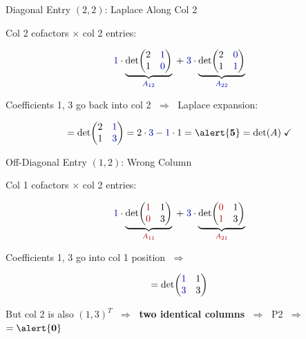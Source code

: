 \documentclass[10pt]{beamer}
\theoremstyle{definition}
\newcommand{\x}[1]{\alert{\textbf{#1}}}
\newcommand{\rd}[1]{{\color{red!70!black}#1}}
\newcommand{\bl}[1]{{\color{blue!70!black}#1}}
\begin{document}
\begin{frame}{Diagonal Entry $(2,2)$: Laplace Along \bl{Col 2}}

\bl{Col 2} cofactors $\times$ \bl{col 2} entries:

$$\bl{1}\cdot\underbrace{\det\!\begin{pmatrix}2&\bl{1}\\1&\bl{0}\end{pmatrix}}_{\bl{A_{12}}}
\;+\;
\bl{3}\cdot\underbrace{\det\!\begin{pmatrix}2&\bl{0}\\1&\bl{1}\end{pmatrix}}_{\bl{A_{22}}}$$

\vfill

Coefficients \bl{1}, \bl{3} go back into \bl{col 2} $\;\Longrightarrow\;$ Laplace expansion:

$$= \det\!\begin{pmatrix}2&\bl{1}\\1&\bl{3}\end{pmatrix}
= 2\cdot\bl{3} - \bl{1}\cdot 1 = \x{5} = \det(A) \;\checkmark$$

\end{frame}


\begin{frame}{Off-Diagonal Entry $(1,2)$: Wrong Column}

\rd{Col 1} cofactors $\times$ \bl{col 2} entries:

$$\bl{1}\cdot\underbrace{\det\!\begin{pmatrix}\rd{1}&1\\\rd{0}&3\end{pmatrix}}_{\rd{A_{11}}}
\;+\;
\bl{3}\cdot\underbrace{\det\!\begin{pmatrix}\rd{0}&1\\\rd{1}&3\end{pmatrix}}_{\rd{A_{21}}}$$

\vfill

Coefficients \bl{1}, \bl{3} go into \rd{col 1} position $\;\Longrightarrow\;$

$$= \det\!\begin{pmatrix}\bl{1}&1\\\bl{3}&3\end{pmatrix}$$

\vfill

But col 2 is also $(1,3)^T$ $\;\Longrightarrow\;$ \x{two identical columns} $\;\Longrightarrow\;$ P2 $\;\Longrightarrow\;$ $= \x{0}$

\end{frame}
\end{document}
